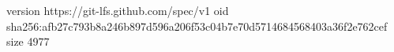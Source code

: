 version https://git-lfs.github.com/spec/v1
oid sha256:afb27c793b8a246b897d596a206f53c04b7e70d5714684568403a36f2e762cef
size 4977
